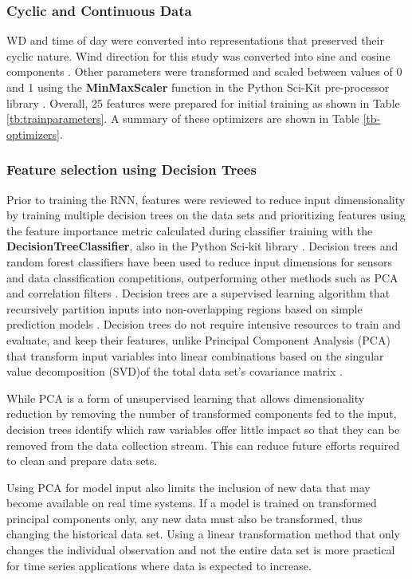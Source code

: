 \documentclass[preprint,12pt,authoryear]{elsarticle}
\begin{document}
\begin{linenumbers}
\subsubsection{Cyclic and Continuous Data}
WD and time of day were converted into representations that preserved their cyclic nature. Wind direction for this study was converted into sine and cosine components \citep{Arhami2013}. Other parameters were transformed and scaled between values of 0 and 1 \citep{Chatterjee2017} using the \textbf{MinMaxScaler} function in the Python Sci-Kit pre-processor library \citep{scikit2011}. Overall, 25 features were prepared for initial training as shown in Table \ref{tb:trainparameters}. A summary of these optimizers are shown in Table \ref{tb-optimizers}.
%

%
 
\subsubsection{Feature selection using Decision Trees}
Prior to training the RNN, features were reviewed to reduce input dimensionality by training multiple decision trees  on the data sets and prioritizing features using the feature importance metric calculated during classifier training with the \textbf{DecisionTreeClassifier}, also in the Python Sci-kit library \citep{scikit2011}. Decision trees and random forest classifiers have been used to reduce input dimensions for sensors \citep{Cho2011} and data classification competitions, outperforming other methods such as PCA and correlation filters \citep{Silipo2014, Al-Alawi2008}. Decision trees are a supervised learning algorithm that recursively partition inputs into non-overlapping regions based on simple prediction models \citep{Loh2011}.  Decision trees do not require intensive resources to train and evaluate, and keep their features, unlike Principal Component Analysis (PCA) that transform input variables into linear combinations based on the singular value decomposition (SVD)of the total data set's covariance matrix \citep{Wang2016}. 

While PCA is a form of unsupervised learning that allows dimensionality reduction by removing the number of transformed components fed to the input, decision trees identify which raw variables offer little impact so that they can be removed from the data collection stream. This can reduce future efforts required to clean and prepare data sets. 

Using PCA for model input also limits the inclusion of new data that may become available on real time systems. If a model is trained on transformed principal components only, any new data must also be transformed, thus changing the historical data set. Using a linear transformation method that only changes the individual observation and not the entire data set is more practical for time series applications where data is expected to increase. 


\end{linenumbers}
\end{document}

